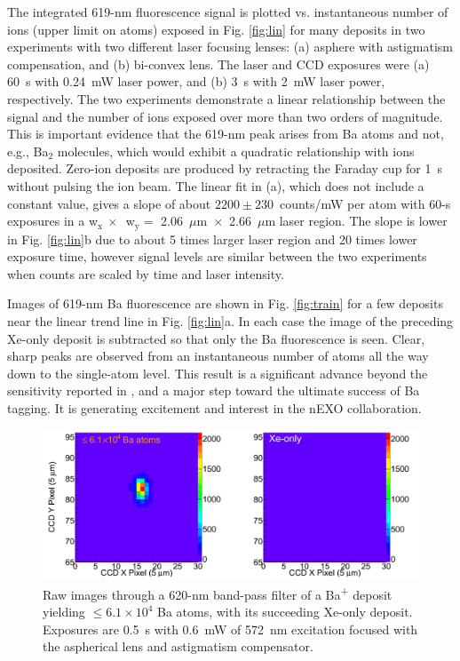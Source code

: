 The integrated 619-nm fluorescence signal is plotted vs. instantaneous number of ions (upper limit on atoms) exposed in Fig. \ref{fig:lin} for many deposits in two experiments with two different laser focusing lenses:  (a) asphere with astigmatism compensation, and (b) bi-convex lens.  The laser and CCD exposures were (a) 60~s with 0.24~mW laser power, and (b) 3~s with 2~mW laser power, respectively.  The two experiments demonstrate a linear relationship between the signal and the number of ions exposed over more than two orders of magnitude.  This is important evidence that the 619-nm peak arises from Ba atoms and not, e.g., Ba$_{2}$ molecules, which would exhibit a quadratic relationship with ions deposited.  Zero-ion deposits are produced by retracting the Faraday cup for 1~s without pulsing the ion beam.  The linear fit in (a), which does not include a constant value, gives a slope of about $2200 \pm 230$~counts/mW per atom with 60-s exposures in a w$_{\text{x}}~\times$~w$_{\text{y}} =$ 2.06~$\mu$m~$\times$~2.66~$\mu$m laser region.  The slope is lower in Fig. \ref{fig:lin}b due to about 5 times larger laser region and 20 times lower exposure time, however signal levels are similar between the two experiments when counts are scaled by time and laser intensity.%

Images of 619-nm Ba fluorescence are shown in Fig. \ref{fig:train} for a few deposits near the linear trend line in Fig. \ref{fig:lin}a.  In each case the image of the preceding Xe-only deposit is subtracted so that only the Ba fluorescence is seen.  Clear, sharp peaks are observed from an instantaneous number of atoms all the way down to the single-atom level.  This result is a significant advance beyond the sensitivity reported in \cite{Mong2015}, and a major step toward the ultimate success of Ba tagging.  It is generating excitement and interest in the nEXO collaboration.


\begin{figure} %
        \centering
                \includegraphics[width=.95\textwidth]{figures/xebaxe_largest_instantaneous.png}
                \caption{Raw images through a 620-nm band-pass filter of a Ba\textsuperscript{+} deposit yielding $\leq 6.1 \times 10^{4}$ Ba atoms, with its succeeding Xe-only deposit.  Exposures are 0.5~s with 0.6~mW of 572~nm excitation focused with the aspherical lens and astigmatism compensator.}
\label{fig:xebaxeLarger}
\end{figure}

